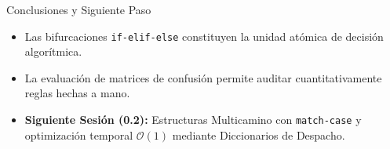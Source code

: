 \documentclass[aspectratio=169]{beamer}
\begin{document}
\begin{frame}{Conclusiones y Siguiente Paso}
    \begin{itemize}
        \item Las bifurcaciones \texttt{if-elif-else} constituyen la unidad atómica de decisión algorítmica.
        \item La evaluación de matrices de confusión permite auditar cuantitativamente reglas hechas a mano.
        \item \textbf{Siguiente Sesión (0.2):} Estructuras Multicamino con \texttt{match-case} y optimización temporal $\mathcal{O}(1)$ mediante Diccionarios de Despacho.
    \end{itemize}
\end{frame}
\end{document}
